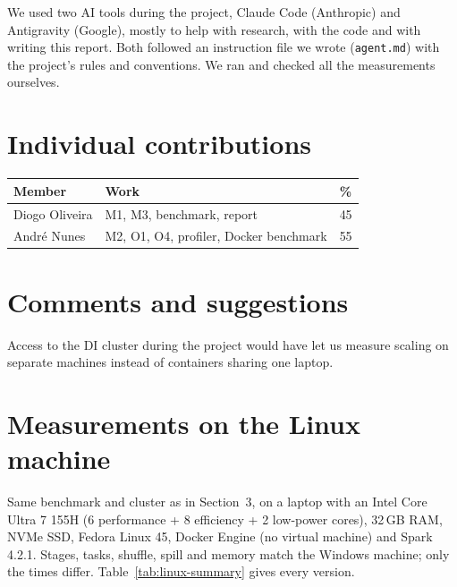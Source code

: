 \documentclass[sigconf]{acmart}
\begin{document}
\clearpage
\begin{acks}
We used two AI tools during the project, Claude Code (Anthropic) and Antigravity (Google), mostly to help with
research, with the code and with writing this report. Both followed an instruction file we wrote
(\texttt{agent.md}) with the project's rules and conventions. We ran and checked all the measurements ourselves.
\end{acks}

\section*{Individual contributions}
\begin{tabular}{@{}l>{\raggedright\arraybackslash}p{}l@{}}
\toprule
Member & Work & \% \\
\midrule
Diogo Oliveira & M1, M3, benchmark, report & 45 \\
Andr\'e Nunes & M2, O1, O4, profiler, Docker benchmark & 55 \\
\bottomrule
\end{tabular}


\section*{Comments and suggestions}
Access to the DI cluster during the project would have let us measure scaling on separate machines instead of containers
sharing one laptop.




\appendix
\section{Measurements on the Linux machine}\label{sec:linux}
Same benchmark and cluster as in Section~3, on a laptop with an Intel Core Ultra 7 155H (6 performance + 8 efficiency
+ 2 low-power cores), 32\,GB RAM, NVMe SSD, Fedora Linux 45, Docker Engine (no virtual machine) and Spark 4.2.1. Stages, tasks,
shuffle, spill and memory match the Windows machine; only the times differ. Table~\ref{tab:linux-summary} gives every version. 
\end{document}
